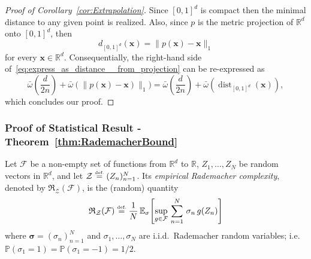\documentclass{article}
\numberwithin{equation}{section}
\theoremstyle{definition}
\newcommand{\eqdef}{\ensuremath{\stackrel{\mbox{\upshape\tiny def.}}{=}}}
\begin{document}
\begin{proof}[{Proof of Corollary~\ref{cor:Extrapolation}}]
Since $[0,1]^d$ is compact then the minimal distance to any given point is realized. Also, since $p$ is the metric projection of $\mathbb{R}^d$ onto $[0,1]^d$, then 
\[
    d_{[0,1]^d}(\mathbf{x}) = \|p(\mathbf{x})-\mathbf{x}\|_1
\]
for every $\mathbf{x}\in \mathbb{R}^d$.  Consequentially, the right-hand side of~\eqref{eq:express_as_distance__from_projection} can be re-expressed as
\[
        \bar{\omega}\left(\frac{d}{2n}\right)
        +
        \bar{\omega}(\|p(\mathbf{x})-\mathbf{x})\|_1)
    =
        \bar{\omega}\left(\frac{d}{2n}\right)
        +
        \bar{\omega}(\operatorname{dist}_{[0,1]^d}(\mathbf{x}))
,
\]
which concludes our proof.
\end{proof}



\subsubsection{{Proof of Statistical Result - Theorem~\ref{thm:RademacherBound}}}
\label{s:learning_theory_proofs}
Let $\mathcal{F}$ be a non-empty set of functions from $\mathbb{R}^d$ to $\mathbb{R}$, $Z_1,\dots,Z_N$ be random vectors in $\mathbb{R}^d$, and let $\mathcal{Z}\eqdef (Z_n)_{n=1}^N$.
Its \textit{empirical Rademacher complexity}, denoted by $\mathfrak{R}_{\mathcal{Z}}(\mathcal{F})$, is the (random) quantity
\begin{equation}
\label{eq:RademacherComplexityDefinition}
        \mathfrak{R}_{\mathcal{Z}}(\mathcal{F})
    \eqdef 
        \frac1{N}
        \,
            \mathbb{E}_{\sigma}\Biggl[
                \sup_{g\in \mathcal{F}}\,
                \sum_{n=1}^N\,
                    \sigma_n\,g(Z_n)
            \Biggr]
\end{equation}
where $\mathbf{\sigma}=(\sigma_n)_{n=1}^N$ and $\sigma_1,\dots,\sigma_N$ are i.i.d.\ Rademacher random variables; i.e.\ $\mathbb{P}(\sigma_1=1)=\mathbb{P}(\sigma_1=-1)=1/2$.
\end{document}
